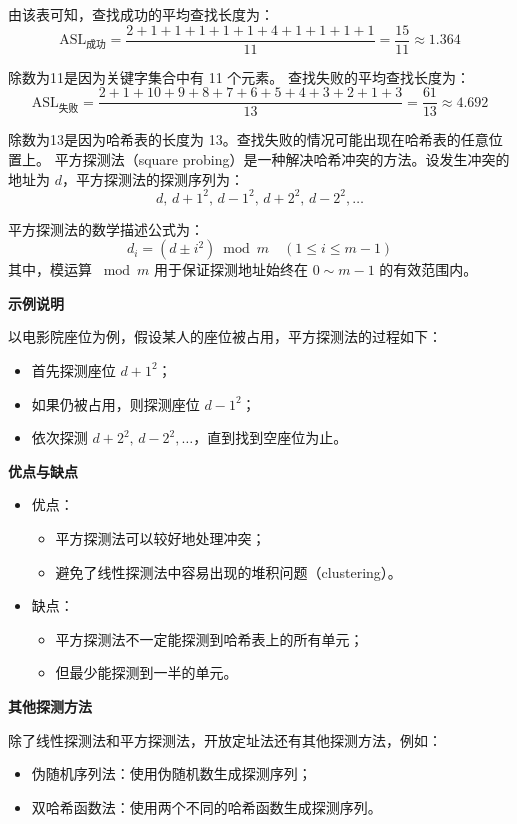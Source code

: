 \documentclass[lang=cn,newtx,10pt,scheme=chinese]{elegantbook}
\begin{document}
由该表可知，查找成功的平均查找长度为：
\[
\text{ASL}_{\text{成功}} = \frac{2 + 1 + 1 + 1 + 1 + 1 + 4 + 1 + 1 + 1 + 1}{11} = \frac{15}{11} \approx 1.364
\]

除数为11是因为关键字集合中有 11 个元素。
查找失败的平均查找长度为：
\[
\text{ASL}_{\text{失败}} = \frac{2 + 1 + 10 + 9 + 8 + 7 + 6 + 5 + 4 + 3 + 2 + 1 + 3}{13} = \frac{61}{13} \approx  4.692
\]

除数为13是因为哈希表的长度为 13。查找失败的情况可能出现在哈希表的任意位置上。
平方探测法（square probing）是一种解决哈希冲突的方法。设发生冲突的地址为 $d$，平方探测法的探测序列为：
\[
d, \, d+1^2, \, d-1^2, \, d+2^2, \, d-2^2, \dots
\]

平方探测法的数学描述公式为：
\[
d_i = (d \pm i^2) \bmod m \quad (1 \leq i \leq m-1)
\]
其中，模运算 $\bmod m$ 用于保证探测地址始终在 $0 \sim m-1$ 的有效范围内。


\textbf{示例说明} 

以电影院座位为例，假设某人的座位被占用，平方探测法的过程如下：
\begin{itemize}
  \item 首先探测座位 $d+1^2$；
  \item 如果仍被占用，则探测座位 $d-1^2$；
  \item 依次探测 $d+2^2, \, d-2^2, \dots$，直到找到空座位为止。
\end{itemize}


\textbf{优点与缺点}  

\begin{itemize}
  \item 优点：  
    \begin{itemize}
      \item 平方探测法可以较好地处理冲突；
      \item 避免了线性探测法中容易出现的堆积问题（clustering）。
    \end{itemize}
  \item 缺点：  
    \begin{itemize}
      \item 平方探测法不一定能探测到哈希表上的所有单元；
      \item 但最少能探测到一半的单元。
    \end{itemize}
\end{itemize}


\textbf{其他探测方法}  

除了线性探测法和平方探测法，开放定址法还有其他探测方法，例如：
\begin{itemize}
  \item 伪随机序列法：使用伪随机数生成探测序列；
  \item 双哈希函数法：使用两个不同的哈希函数生成探测序列。
\end{itemize}
\end{document}
